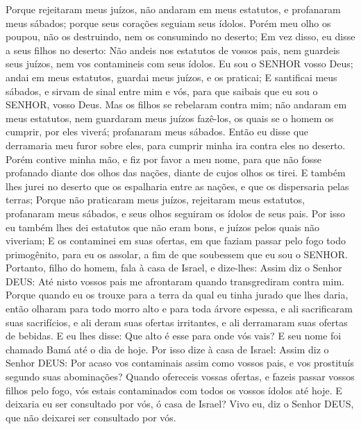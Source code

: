 {Porque rejeitaram meus juízos, não andaram em meus estatutos, e profanaram meus sábados; porque seus corações seguiam seus ídolos.
Porém meu olho os poupou, não os destruindo, nem os consumindo no deserto;
Em vez disso, eu disse a seus filhos no deserto: Não andeis nos estatutos de vossos pais, nem guardeis seus juízos, nem vos contamineis com seus ídolos.
Eu sou o SENHOR vosso Deus; andai em meus estatutos, guardai meus juízos, e os praticai;
E santificai meus sábados, e sirvam de sinal entre mim e vós, para que saibais que eu sou o SENHOR, vosso Deus.
Mas os filhos se rebelaram contra mim; não andaram em meus estatutos, nem guardaram meus juízos fazê-los, os quais se o homem os cumprir, por eles viverá;
{} profanaram meus sábados. Então eu disse que derramaria meu furor sobre eles, para cumprir minha ira contra eles no deserto.
Porém contive minha mão, e fiz por favor a meu nome, para que não fosse profanado diante dos olhos das nações, diante de cujos olhos os tirei.
E também lhes jurei no deserto que os espalharia entre as nações, e que os dispersaria pelas terras;
Porque não praticaram meus juízos, rejeitaram meus estatutos, profanaram meus sábados, e seus olhos seguiram os ídolos de seus pais.
Por isso eu também lhes dei estatutos que não eram bons, e juízos pelos quais não viveriam;
E os contaminei em suas ofertas, em que faziam passar pelo fogo todo primogênito, para eu os assolar, a fim de que soubessem que eu sou o SENHOR.
Portanto, filho do homem, fala à casa de Israel, e dize-lhes: Assim diz o Senhor DEUS: Até nisto vossos pais me afrontaram quando transgrediram contra mim.
Porque quando eu os trouxe para a terra da qual eu tinha jurado
 que lhes daria, então olharam para todo morro alto e para toda árvore espessa, e ali sacrificaram suas sacrifícios, e ali deram suas ofertas irritantes, e ali derramaram suas ofertas de bebidas.
E eu lhes disse: Que alto é esse para onde vós vais? E seu nome foi chamado Bamá até o dia de hoje.
Por isso dize à casa de Israel: Assim diz o Senhor DEUS: Por acaso
{} vos contaminais assim como vossos pais, e vos prostituís segundo suas abominações?
Quando ofereceis vossas ofertas, e fazeis passar vossos filhos pelo fogo, vós estais contaminados com todos os vossos ídolos até hoje. E deixaria eu ser consultado por vós, ó casa de Israel? Vivo eu, diz o Senhor DEUS, que não deixarei ser consultado por vós.
}

